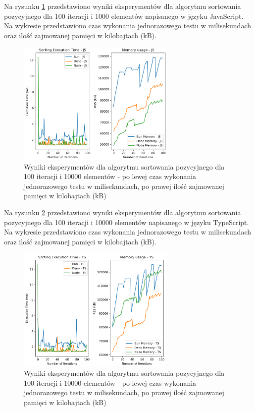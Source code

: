 Na rysunku \ref{fig:radix_sorting_e2} przedstawiono wyniki eksperymentów dla algorytmu sortowania pozycyjnego dla 100 iteracji i 1000 elementów napisanego w języku JavaScript. Na wykresie przedstawiono czas wykonania jednorazowego testu w milisekundach oraz ilość zajmowanej pamięci w kilobajtach (kB).

\begin{figure}[H]
  \centering
  \includegraphics[width=0.68\textwidth]{Figures/sorting/sorting_radix_100_10000_js.png}
  \caption{Wyniki eksperymentów dla algorytmu sortowania pozycyjnego dla 100 iteracji i 10000 elementów - po lewej czas wykonania jednorazowego testu w milisekundach, po prawej ilość zajmowanej pamięci w kilobajtach (kB)}
  \label{fig:radix_sorting_e2}
\end{figure}

Na rysunku \ref{fig:radix_sorting_e2_ts} przedstawiono wyniki eksperymentów dla algorytmu sortowania pozycyjnego dla 100 iteracji i 10000 elementów napisanego w języku TypeScript. Na wykresie przedstawiono czas wykonania jednorazowego testu w milisekundach oraz ilość zajmowanej pamięci w kilobajtach (kB).

\begin{figure}[H]
  \centering
  \includegraphics[width=0.68\textwidth]{Figures/sorting/sorting_radix_100_10000_ts.png}
  \caption{Wyniki eksperymentów dla algorytmu sortowania pozycyjnego dla 100 iteracji i 10000 elementów - po lewej czas wykonania jednorazowego testu w milisekundach, po prawej ilość zajmowanej pamięci w kilobajtach (kB)}
  \label{fig:radix_sorting_e2_ts}
\end{figure}

